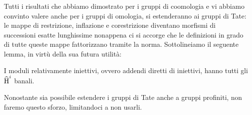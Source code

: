 Tutti i risultati che abbiamo dimostrato per i gruppi di coomologia e vi abbiamo convinto valere anche per i gruppi di omologia, si estenderanno ai gruppi di Tate: le mappe di restrizione, inflazione e corestrizione diventano morfismi di successioni esatte lunghissime nonappena ci si accorge che le definizioni in grado di tutte queste mappe fattorizzano tramite la norma. Sottolineiamo il seguente lemma, in virtù della sua futura utilità:

\begin{lemma}
	I moduli relativamente iniettivi, ovvero addendi diretti di iniettivi, hanno tutti gli $ \operatorname{\widehat{H}}^i $ banali.
\end{lemma}


\begin{profinite}
	Nonostante sia possibile estendere i gruppi di Tate anche a gruppi profiniti, non faremo questo sforzo, limitandoci a non usarli.
\end{profinite}

